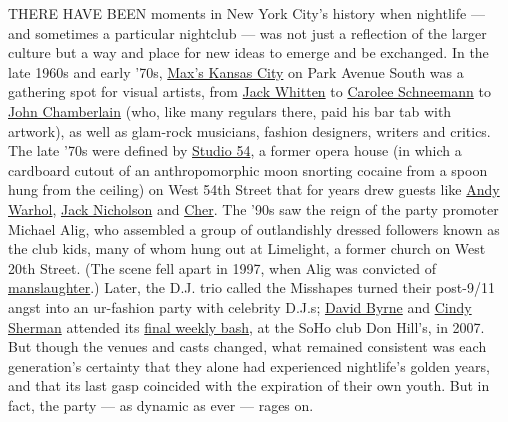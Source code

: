 THERE HAVE BEEN moments in New York City's history when nightlife ---
and sometimes a particular nightclub --- was not just a reflection of
the larger culture but a way and place for new ideas to emerge and be
exchanged. In the late 1960s and early '70s,
\href{https://www.nytimes.com/2010/09/05/arts/design/05maxs.html}{Max's
Kansas City} on Park Avenue South was a gathering spot for visual
artists, from
\href{https://www.nytimes.com/2018/01/23/obituaries/jack-whitten-artist-of-wide-ranging-curiosity-dies-at-78.html}{Jack
Whitten} to
\href{https://www.nytimes.com/2019/03/10/obituaries/carolee-schneemann-dead-at-79.html}{Carolee
Schneemann} to
\href{https://www.nytimes.com/2011/12/22/arts/design/john-chamberlain-artist-of-auto-metal-dies-at-84.html}{John
Chamberlain} (who, like many regulars there, paid his bar tab with
artwork), as well as glam-rock musicians, fashion designers, writers and
critics. The late '70s were defined by
\href{https://www.nytimes.com/2018/10/05/movies/studio-54-documentary-ian-schrager.html}{Studio
54}, a former opera house (in which a cardboard cutout of an
anthropomorphic moon snorting cocaine from a spoon hung from the
ceiling) on West 54th Street that for years drew guests like
\href{https://www.nytimes.com/topic/person/andy-warhol}{Andy Warhol},
\href{https://www.nytimes.com/topic/person/jack-nicholson}{Jack
Nicholson} and
\href{https://www.nytimes.com/2018/09/04/arts/music/cher-abba-broadway-interview.html}{Cher}.
The '90s saw the reign of the party promoter Michael Alig, who assembled
a group of outlandishly dressed followers known as the club kids, many
of whom hung out at Limelight, a former church on West 20th Street. (The
scene fell apart in 1997, when Alig was convicted of
\href{https://www.nytimes.com/1997/09/11/nyregion/2-men-plead-guilty-in-killing-of-club-denizen.html}{manslaughter}.)
Later, the D.J. trio called the Misshapes turned their post-9/11 angst
into an ur-fashion party with celebrity D.J.s;
\href{https://www.nytimes.com/2019/11/11/t-magazine/david-byrne-binder.html}{David
Byrne} and
\href{https://www.nytimes.com/topic/person/cindy-sherman}{Cindy Sherman}
attended its
\href{https://www.nytimes.com/2007/09/10/arts/10miss.html}{final weekly
bash}, at the SoHo club Don Hill's, in 2007. But though the venues and
casts changed, what remained consistent was each generation's certainty
that they alone had experienced nightlife's golden years, and that its
last gasp coincided with the expiration of their own youth. But in fact,
the party --- as dynamic as ever --- rages on.

